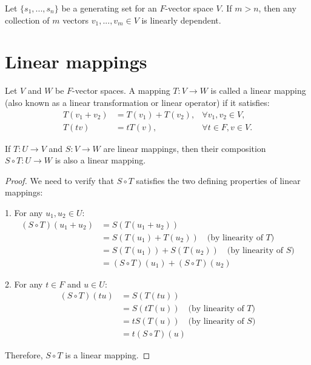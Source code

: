 \begin{lemma}
  Let $\{s_1,...,s_n\}$ be a generating set for an $F$-vector space $V$. If $m > n$, then any collection of $m$ vectors $v_1,...,v_m \in V$ is linearly dependent.
\end{lemma}

\section{Linear mappings}

\begin{definition}
  Let $V$ and $W$ be $F$-vector spaces. A mapping $T: V \rightarrow W$ is called a linear mapping (also known as a linear transformation or linear operator) if it satisfies:
  \begin{align*}
    T(v_1 + v_2) &= T(v_1) + T(v_2), & \forall v_1, v_2 \in V,\\
    T(tv) &= tT(v), & \forall t \in F, v \in V.
  \end{align*}
\end{definition}

\begin{lemma}
  If $T: U \rightarrow V$ and $S: V \rightarrow W$ are linear mappings, then their composition $S \circ T: U \rightarrow W$ is also a linear mapping.
\end{lemma}

\begin{proof}
  We need to verify that $S \circ T$ satisfies the two defining properties of linear mappings:

  1. For any $u_1, u_2 \in U$:
  \begin{align*}
    (S \circ T)(u_1 + u_2) &= S(T(u_1 + u_2)) \\
    &= S(T(u_1) + T(u_2)) \quad \text{(by linearity of $T$)} \\
    &= S(T(u_1)) + S(T(u_2)) \quad \text{(by linearity of $S$)} \\
    &= (S \circ T)(u_1) + (S \circ T)(u_2)
  \end{align*}

  2. For any $t \in F$ and $u \in U$:
  \begin{align*}
    (S \circ T)(tu) &= S(T(tu)) \\
    &= S(tT(u)) \quad \text{(by linearity of $T$)} \\
    &= tS(T(u)) \quad \text{(by linearity of $S$)} \\
    &= t(S \circ T)(u)
  \end{align*}

  Therefore, $S \circ T$ is a linear mapping.
\end{proof}

